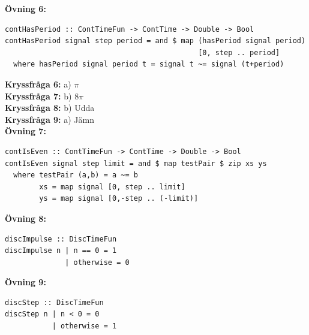 \documentclass{article}
\begin{document}
\textbf{Övning 6:}
\begin{verbatim}
contHasPeriod :: ContTimeFun -> ContTime -> Double -> Bool
contHasPeriod signal step period = and $ map (hasPeriod signal period)
                                             [0, step .. period]
  where hasPeriod signal period t = signal t ~= signal (t+period)
\end{verbatim}


\textbf{Kryssfråga 6:} a) $\pi$
\\

\textbf{Kryssfråga 7:} b) $8\pi$
\\

\textbf{Kryssfråga 8:} b) Udda
\\

\textbf{Kryssfråga 9:} a) Jämn
\\

\textbf{Övning 7:}
\begin{verbatim}
contIsEven :: ContTimeFun -> ContTime -> Double -> Bool
contIsEven signal step limit = and $ map testPair $ zip xs ys
  where testPair (a,b) = a ~= b
        xs = map signal [0, step .. limit]
        ys = map signal [0,-step .. (-limit)]
\end{verbatim}


\textbf{Övning 8:}
\begin{verbatim}
discImpulse :: DiscTimeFun
discImpulse n | n == 0 = 1
              | otherwise = 0
\end{verbatim}

\textbf{Övning 9:}
\begin{verbatim}
discStep :: DiscTimeFun
discStep n | n < 0 = 0
           | otherwise = 1
\end{verbatim}
\end{document}
